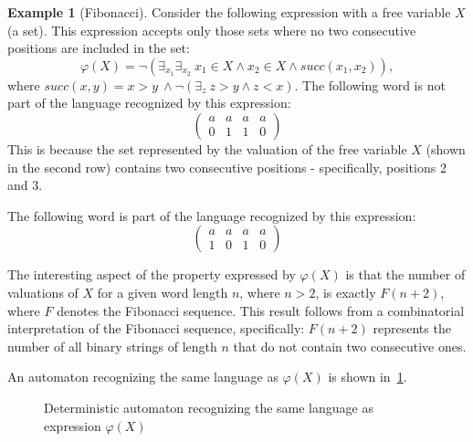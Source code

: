 \documentclass[12pt]{article}
\newcommand{\icol}[1]{%
  \left(\begin{smallmatrix}#1\end{smallmatrix}\right)%
}
\theoremstyle{definition}
\newtheorem{example}{Example}[section]
\begin{document}
\begin{example}[Fibonacci]
    \label{ExFib}
    Consider the following expression with a free variable $X$ (a set). This expression accepts only those sets where no two consecutive positions are included in the set:
    $$\varphi(X) = \neg(\exists_{x_1}\exists_{x_2} \ x_1 \in X \land x_2 \in X \land succ(x_1, x_2)),$$
    where $succ(x,y) = x > y~\land \neg (\exists_z \ z > y \land z < x)$.
    The following word is not part of the language recognized by this expression:
    $$\begin{pmatrix}
        a & a & a & a\\
        0 & 1 & 1 & 0
    \end{pmatrix}$$
    This is because the set represented by the valuation of the free variable $X$ (shown in the second row) contains two consecutive positions - specifically, positions 2 and 3.

    The following word is part of the language recognized by this expression:
    $$\begin{pmatrix}
        a & a & a & a\\
        1 & 0 & 1 & 0
    \end{pmatrix}$$

    The interesting aspect of the property expressed by $\varphi(X)$ is that the number of valuations of $X$ for a given word length $n$, where $n > 2$, is exactly $F(n + 2)$, where $F$ denotes the Fibonacci sequence. This result follows from a combinatorial interpretation of the Fibonacci sequence, specifically: $F(n+2)$ represents the number of all binary strings of length $n$ that do not contain two consecutive ones.

    An automaton recognizing the same language as $\varphi(X)$ is shown in~\cref{fig:my_label}.

    \begin{figure}[ht]
        \centering
        \caption{Deterministic automaton recognizing the same language as expression $\varphi(X)$}
        \label{fig:my_label}
    \end{figure}
\end{example} \
\end{document}
